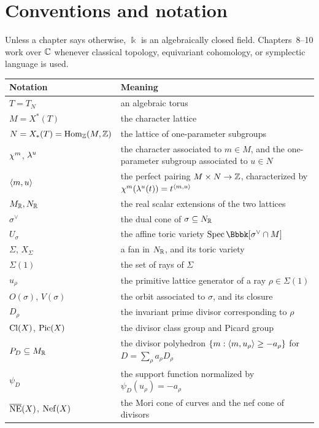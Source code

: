\chapter*{Conventions and notation}

Unless a chapter says otherwise, \(\Bbbk\) is an algebraically closed
field. Chapters~8--10 work over \(\mathbb{C}\) whenever classical topology,
equivariant cohomology, or symplectic language is used.

\begin{center}
\renewcommand{\arraystretch}{1.18}
\begin{tabularx}{\textwidth}{@{}>{\raggedright\arraybackslash}p{}X@{}}
\toprule
\textbf{Notation} & \textbf{Meaning} \\
\midrule
\(T=T_N\) & an algebraic torus \\
\(M=X^*(T)\) & the character lattice \\
\(N=X_*(T)=\operatorname{Hom}_{\mathbb{Z}}(M,\mathbb{Z})\) & the lattice of one-parameter subgroups \\
\(\chi^{m}\), \(\lambda^{u}\) & the character associated to \(m\in M\), and the one-parameter subgroup associated to \(u\in N\) \\
\(\left\langle m,u\right\rangle\) & the perfect pairing \(M\times N\to\mathbb{Z}\), characterized by \(\chi^{m}(\lambda^{u}(t))=t^{\left\langle m,u\right\rangle}\) \\
\(M_{\mathbb{R}},N_{\mathbb{R}}\) & the real scalar extensions of the two lattices \\
\(\sigma^\vee\) & the dual cone of \(\sigma\subseteq N_{\mathbb{R}}\) \\
\(U_\sigma\) & the affine toric variety \(\Spec\Bbbk[\sigma^\vee\cap M]\) \\
\(\Sigma\), \(X_\Sigma\) & a fan in \(N_{\mathbb{R}}\), and its toric variety \\
\(\Sigma(1)\) & the set of rays of \(\Sigma\) \\
\(u_\rho\) & the primitive lattice generator of a ray \(\rho\in\Sigma(1)\) \\
\(O(\sigma)\), \(V(\sigma)\) & the orbit associated to \(\sigma\), and its closure \\
\(D_\rho\) & the invariant prime divisor corresponding to \(\rho\) \\
\(\operatorname{Cl}(X)\), \(\operatorname{Pic}(X)\) & the divisor class group and Picard group \\
\(P_D\subseteq M_{\mathbb{R}}\) & the divisor polyhedron \(\{m:\left\langle m,u_\rho\right\rangle\geq-a_\rho\}\) for \(D=\sum_\rho a_\rho D_\rho\) \\
\(\psi_D\) & the support function normalized by \(\psi_D(u_\rho)=-a_\rho\) \\
\(\overline{\operatorname{NE}}(X)\), \(\operatorname{Nef}(X)\) & the Mori cone of curves and the nef cone of divisors \\
\bottomrule
\end{tabularx}
\end{center}

